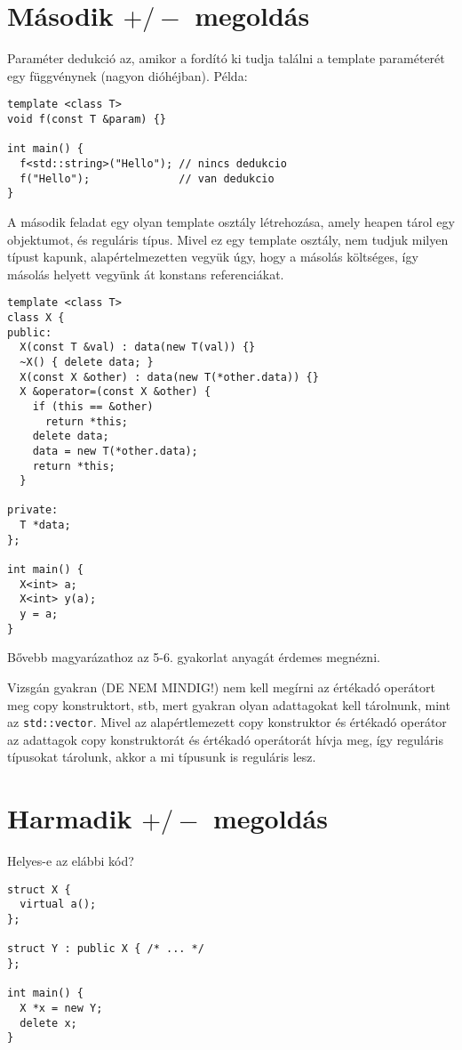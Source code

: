 \documentclass[a4paper,11.5pt]{article}
\begin{document}
	\section{Második $+/-$ megoldás}
	Paraméter dedukció az, amikor a fordító ki tudja találni a template paraméterét egy függvénynek (nagyon dióhéjban). Példa:
	\begin{lstlisting}
template <class T>
void f(const T &param) {}

int main() {
  f<std::string>("Hello"); // nincs dedukcio
  f("Hello");              // van dedukcio
}
	\end{lstlisting}
	
	A második feladat egy olyan template osztály létrehozása, amely heapen tárol egy objektumot, és reguláris típus. Mivel ez egy template osztály, nem tudjuk milyen típust kapunk, alapértelmezetten vegyük úgy, hogy a másolás költséges, így másolás helyett vegyünk át konstans referenciákat.
	\begin{lstlisting}
template <class T>
class X {
public:
  X(const T &val) : data(new T(val)) {}
  ~X() { delete data; }
  X(const X &other) : data(new T(*other.data)) {}
  X &operator=(const X &other) {
    if (this == &other)
      return *this;
    delete data;
    data = new T(*other.data);
    return *this;
  }

private:
  T *data;
};

int main() {
  X<int> a;
  X<int> y(a);
  y = a;
}
	\end{lstlisting}
	Bővebb magyarázathoz az 5-6. gyakorlat anyagát érdemes megnézni.
	
	\medskip
	Vizsgán gyakran (DE NEM MINDIG!) nem kell megírni az értékadó operátort meg copy konstruktort, stb, mert gyakran olyan adattagokat kell tárolnunk, mint az \texttt{std::vector}. Mivel az alapértlemezett copy konstruktor és értékadó operátor az adattagok copy konstruktorát és értékadó operátorát hívja meg, így reguláris típusokat tárolunk, akkor a mi típusunk is reguláris lesz.
	\section{Harmadik $+/-$ megoldás}
	Helyes-e az elábbi kód?
		
	\begin{lstlisting}
struct X {
  virtual a();
};

struct Y : public X { /* ... */
};

int main() {
  X *x = new Y;
  delete x;
}
	\end{lstlisting}
		
\end{document}
